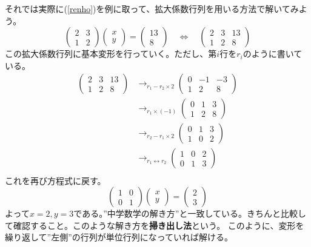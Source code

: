 \documentclass[10pt]{jsarticle}
\theoremstyle{definition}%
\newcommand{\kakko}[1]{\left(#1 \right)} %
\numberwithin{equation}{section}%
\begin{document}
それでは実際に(\ref{renho})を例に取って、拡大係数行列を用いる方法で解いてみよう。
\begin{equation}
  \kakko{\begin{matrix}
    2 & 3\\
    1 & 2
  \end{matrix}}
  \kakko{\begin{matrix}
    x\\
    y
  \end{matrix}}
  =
  \kakko{\begin{matrix}
    13\\
    8
  \end{matrix}}\quad \Leftrightarrow \quad 
  \kakko{\begin{array}{cc|c} 
    2 & 3  & 13 \\ 
   1 & 2 & 8
  \end{array}}
\end{equation}
この拡大係数行列に基本変形を行っていく。ただし、第$i$行を$r_{i}$のように書いている。
\begin{align}
  \kakko{\begin{array}{cc|c} 
    2 & 3  & 13 \\ 
   1 & 2 & 8
  \end{array}}&\to_{r_{1}-r_{2}\times 2} 
  \kakko{\begin{array}{cc|c} 
    0 & -1  & -3 \\ 
   1 & 2 & 8
  \end{array}}\\
  &\to_{r_{1}\times(-1)}
  \kakko{\begin{array}{cc|c} 
    0 & 1  & 3 \\ 
   1 & 2 & 8
  \end{array}}\\
  &\to_{r_{2}-r_{1}\times 2}
  \kakko{\begin{array}{cc|c} 
    0 & 1  & 3 \\ 
   1 & 0 & 2
  \end{array}}\\
  &\to_{r_{1}\leftrightarrow r_{2}}
  \kakko{\begin{array}{cc|c}  
   1 & 0 & 2\\
   0 & 1  & 3 
  \end{array}}\\
\end{align}
これを再び方程式に戻す。
\begin{equation}
  \kakko{\begin{matrix}
    1 & 0\\
    0 & 1
  \end{matrix}}
  \kakko{\begin{matrix}
    x\\
    y
  \end{matrix}}
  =
  \kakko{\begin{matrix}
    2\\
    3
  \end{matrix}}
\end{equation}
よって\underline{$x=2,y=3$}である。''中学数学の解き方''と一致している。きちんと比較して確認すること。このような解き方を{\bf 掃き出し法}という。
このように、変形を繰り返して''左側''の行列が単位行列になっていれば解ける。
\end{document}
